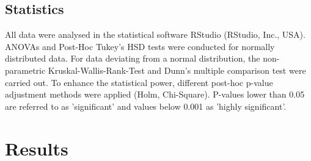 \documentclass[twoside]{article}
\begin{document}
\begin{multicols}{2}
\begin{table}[H]
\centering
\caption{Overview of qPCR conditions.}
\label{tab:pcr}
\end{table}
\FloatBarrier


\subsection{Statistics}
All data were analysed in the statistical software RStudio (RStudio, Inc., USA). ANOVAs and Post-Hoc Tukey's HSD tests were conducted for normally distributed data. For data deviating from a normal distribution, the non-parametric Kruskal-Wallis-Rank-Test and Dunn's multiple comparison test were carried out. To enhance the statistical power, different post-hoc p-value adjustment methods were applied (Holm, Chi-Square).  P-values lower than 0.05 are referred to as 'significant' and values below 0.001 as 'highly significant'. 

\section{Results}  


\end{multicols}
\end{document}
